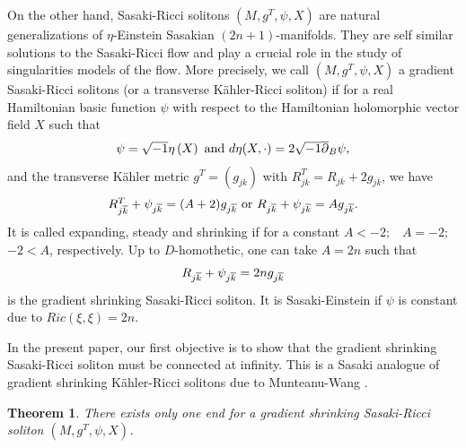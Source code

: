 \documentclass[12pt]{amsart}%
\newtheorem{theorem}{Theorem}
\numberwithin{equation}{section}
\begin{document}
On the other hand, Sasaki-Ricci solitons $(M,g^{T},\psi,X)$ are natural
generalizations of $\eta$-Einstein Sasakian $(2n+1)$-manifolds. They are self
similar solutions to the Sasaki-Ricci flow and play a crucial role in the
study of singularities models of the flow. More precisely, we call
$(M,g^{T},\psi,X)$ a gradient Sasaki-Ricci solitons (or a transverse
K\"{a}hler-Ricci soliton) if for a real Hamiltonian basic function $\psi$ with
respect to the Hamiltonian holomorphic vector field $X$ such that
\begin{equation}%
\begin{array}
[c]{c}%
\psi=\sqrt{-1}\eta\left(  X\right)  \text{ \textrm{and} }d\eta(X,\cdot
)=2\sqrt{-1}\overline{\partial}_{B}\psi,
\end{array}
\label{pr1}%
\end{equation}
and the transverse K\"{a}hler metric $g^{T}=(g_{j\overline{k}})$ with
$R_{j\overline{k}}^{T}=R_{j\overline{k}}+2g_{j\overline{k}}$, we have
\[%
\begin{array}
[c]{c}%
R_{j\overline{k}}^{T}+\psi_{j\overline{k}}=(A+2)g_{j\overline{k}}\text{
\textrm{or} }R_{j\overline{k}}+\psi_{j\overline{k}}=Ag_{j\overline{k}}.
\end{array}
\]
It is called expanding, steady and shrinking if for a constant $A<-2;$%
\ $A=-2;$\ $-2<A$, respectively.
Up to
$%
D%
$-homothetic,
one can take
$A=2n$ such that
\begin{equation}%
\begin{array}
[c]{c}%
R_{j\overline{k}}+\psi_{j\overline{k}}=2ng_{j\overline{k}}%
\end{array}
\label{1}%
\end{equation}
is the gradient shrinking Sasaki-Ricci soliton. It is Sasaki-Einstein if
$\psi$ is constant due to $Ric(\xi,\xi)=2n.$

In the present paper, our first objective is to show that the gradient
shrinking Sasaki-Ricci soliton must be connected at infinity. This is a Sasaki
analogue of gradient shrinking K\"{a}hler-Ricci solitons due to Munteanu-Wang
\cite{mw1}.

\begin{theorem}
There exists only one end for a gradient shrinking Sasaki-Ricci soliton
$(M,g^{T},\psi,X)$.
\end{theorem}
\end{document}
